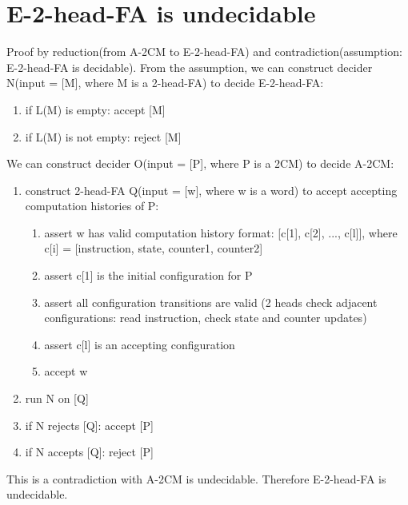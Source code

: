 \documentclass{article}
\begin{document}
\section{E-2-head-FA is undecidable}
Proof by reduction(from A-2CM to E-2-head-FA) and contradiction(assumption: E-2-head-FA is decidable). From the assumption, we can construct decider N(input = [M], where M is a 2-head-FA) to decide E-2-head-FA:
\begin{enumerate}
	\item if L(M) is empty: accept [M]
	\item if L(M) is not empty: reject [M]
\end{enumerate}
We can construct decider O(input = [P], where P is a 2CM) to decide A-2CM:
\begin{enumerate}
	\item construct 2-head-FA Q(input = [w], where w is a word) to accept accepting computation histories of P:
	\begin{enumerate}
		\item assert w has valid computation history format: [c[1], c[2], ..., c[l]], where c[i] = [instruction, state, counter1, counter2]
		\item assert c[1] is the initial configuration for P
		\item assert all configuration transitions are valid (2 heads check adjacent configurations: read instruction, check state and counter updates)
		\item assert c[l] is an accepting configuration
		\item accept w
	\end{enumerate}
	\item run N on [Q]
	\item if N rejects [Q]: accept [P]
	\item if N accepts [Q]: reject [P]
\end{enumerate}
This is a contradiction with A-2CM is undecidable. Therefore E-2-head-FA is undecidable.
\end{document}
